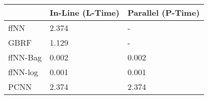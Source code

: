 \begin{tabular}{lll}
\toprule
{} & In-Line (L-Time) & Parallel (P-Time) \\
\midrule
ffNN     &            2.374 &                 - \\
GBRF     &            1.129 &                 - \\
ffNN-Bag &            0.002 &             0.002 \\
ffNN-log &            0.001 &             0.001 \\
PCNN     &            2.374 &             2.374 \\
\bottomrule
\end{tabular}
